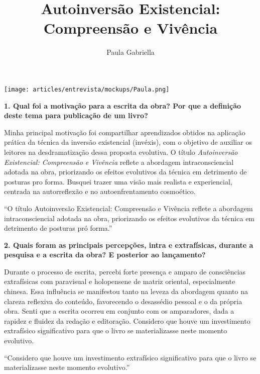 \documentclass{gescons}
\author{Paula Gabriella}
\title{Autoinversão Existencial: Compreensão e Vivência}
\begin{document}
    \makeentrevistatitle

    \begin{multicols}{2}



\begin{center}
    \texttt{[image: articles/entrevista/mockups/Paula.png]}
\end{center}


\textbf{1. Qual foi a motivação para a escrita da obra? Por que a definição deste tema para publicação de um livro?}

Minha principal motivação foi compartilhar aprendizados obtidos na aplicação prática da técnica da inversão existencial (invéxis), com o objetivo de auxiliar os leitores na desdramatização dessa proposta evolutiva. O título \textit{Autoinversão Existencial: Compreensão e Vivência} reflete a abordagem intraconsciencial adotada na obra, priorizando os efeitos evolutivos da técnica em detrimento de posturas pro forma. Busquei trazer uma visão mais realista e experiencial, centrada na autorreflexão e no autoenfrentamento cosmoético.

\begin{pullquote}
    ``O título Autoinversão Existencial: Compreensão e Vivência reflete a abordagem intraconsciencial adotada na obra, priorizando os efeitos evolutivos da técnica em detrimento de posturas pró forma.''
\end{pullquote}

\textbf{2. Quais foram as principais percepções, intra e extrafísicas, durante a pesquisa e a escrita da obra? E posterior ao lançamento?}

Durante o processo de escrita, percebi forte presença e amparo de consciências extrafísicas com paravisual e holopensene de matriz oriental, especialmente chinesa. Essa influência se manifestou tanto na leveza da abordagem quanto na clareza reflexiva do conteúdo, favorecendo o desassédio pessoal e o da própria obra. Senti que a escrita ocorreu em conjunto com os amparadores, dada a rapidez e fluidez da redação e editoração. Considero que houve um investimento extrafísico significativo para que o livro se materializasse neste momento evolutivo.

\begin{pullquote}
    ``Considero que houve um investimento extrafísico significativo para que o livro se materializasse neste momento evolutivo.''
\end{pullquote}


\end{multicols}
\end{document}
